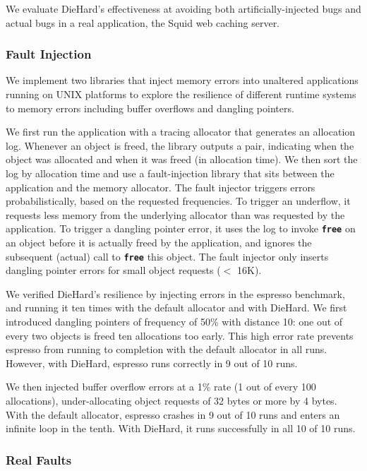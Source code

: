 \documentclass{sig-alternate}
\newcommand{\cfunction}[1]{{\bf \tt #1}}
\newcommand{\free}{\cfunction{free}}
\begin{document}
\noindent
We evaluate DieHard's effectiveness at avoiding both
artificially-injected bugs and actual bugs in a real application, the
Squid web caching server.

\subsubsection{Fault Injection}

\noindent
We implement two libraries that inject memory errors into unaltered
applications running on UNIX platforms to explore the
resilience of different runtime systems to memory errors including
buffer overflows and dangling pointers.

We first run the application with a tracing allocator that generates
an allocation log. Whenever an object is freed, the library outputs a
pair, indicating when the object was allocated and when it was freed
(in allocation time). We then sort the log by allocation time and
use a fault-injection library that sits between the application and
the memory allocator. The fault injector triggers errors
probabilistically, based on the requested frequencies. To trigger an
underflow, it requests less memory from the underlying allocator than
was requested by the application. To trigger a dangling pointer error,
it uses the log to invoke \free{} on an object before it is actually
freed by the application, and ignores the subsequent (actual) call to
\free{} this object. The fault injector only inserts dangling pointer
errors for small object requests ($<$ 16K).

We verified DieHard's resilience by injecting errors in the
\textsf{espresso} benchmark, and running it ten times with the default
allocator and with DieHard. We first introduced dangling pointers of
frequency of 50\% with distance 10: one out of every two objects is
freed ten allocations too early. This high error rate prevents
\textsf{espresso} from running to completion with the default
allocator in all runs. However, with DieHard, \textsf{espresso} runs
correctly in 9 out of 10 runs.

We then injected buffer overflow errors at a 1\% rate (1 out of every
100 allocations), under-allocating object requests of 32 bytes or more
by 4 bytes. With the default allocator, \textsf{espresso} crashes in 9
out of 10 runs and enters an infinite loop in the tenth. With DieHard,
it runs successfully in all 10 of 10 runs.


\subsubsection*{Real Faults}
\end{document}
